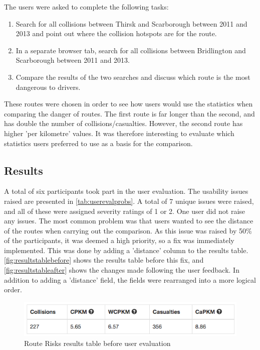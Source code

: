 \documentclass[authoryearcitations]{UoYCSproject}
\begin{document}
The users were asked to complete the following tasks:

\begin{enumerate}
	\item Search for all collisions between Thirsk and Scarborough between 2011 and 2013 and point out where the collision hotspots are for the route.
	\item In a separate browser tab, search for all collisions between Bridlington and Scarborough between 2011 and 2013.
	\item Compare the results of the two searches and discuss which route is the most dangerous to drivers.
\end{enumerate}

These routes were chosen in order to see how users would use the statistics when comparing the danger of routes. The first route is far longer than the second, and has double the number of collisions/casualties. However, the second route has higher 'per kilometre' values. It was therefore interesting to evaluate which statistics users preferred to use as a basis for the comparison.

\subsection{Results}

A total of six participants took part in the user evaluation. The usability issues raised are presented in \autoref{tab:userevalprobs}. A total of 7 unique issues were raised, and all of these were assigned severity ratings of 1 or 2. One user did not raise any issues. The most common problem was that users wanted to see the distance of the routes when carrying out the comparison. As this issue was raised by 50\% of the participants, it was deemed a high priority, so a fix was immediately implemented. This was done by adding a 'distance' column to the results table. \autoref{fig:resultstablebefore} shows the results table before this fix, and \autoref{fig:resultstableafter} shows the changes made following the user feedback. In addition to adding a 'distance' field, the fields were rearranged into a more logical order.

\begin{figure}
	\center
	\includegraphics[scale=0.75]{resultstablebefore}
	\caption{Route Risks results table before user evaluation}
	\label{fig:resultstablebefore}
\end{figure}
\end{document}
